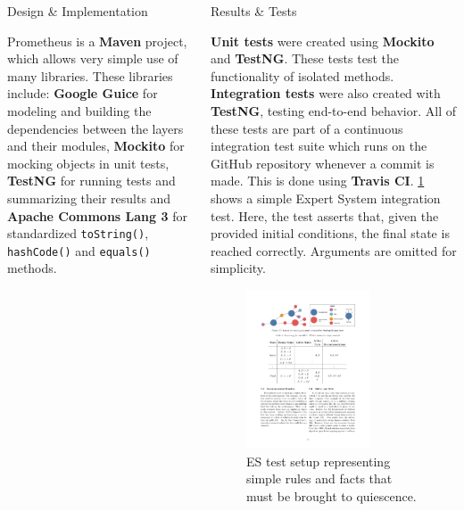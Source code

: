 \documentclass[final]{beamer} %
\newlength{\columnheight}
\newcommand{\code}[1]{\texttt{#1}}
\begin{document}
\begin{frame}
\begin{columns}
\begin{column}{.33\textwidth}
{\begin{block}{Design \& Implementation}
				
				\parbox{0.99\textwidth}{
					Prometheus is a \textbf{Maven} project, which allows very simple use of many libraries. These libraries include: \textbf{Google Guice} for modeling and building the dependencies between the layers and their modules, \textbf{Mockito} for mocking objects in unit tests, \textbf{TestNG} for running tests and summarizing their results and \textbf{Apache Commons Lang 3} for standardized \code{toString()}, \code{hashCode()} and \code{equals()} methods.}
					
				\end{block}
				}
			\end{column}
			\begin{column}{.33\textwidth}
				\parbox[t][\columnheight]{\textwidth}{
				\begin{block}{Results \& Tests}
					\parbox{0.99\textwidth}{
						\textbf{Unit tests} were created using \textbf{Mockito} and \textbf{TestNG}. These tests test the functionality of isolated methods. \textbf{Integration tests} were also created with \textbf{TestNG}, testing end-to-end behavior. All of these tests are part of a continuous integration test suite which runs on the GitHub repository whenever a commit is made. This is done using \textbf{Travis CI}. \cref{fig:test_es} shows a simple Expert System integration test. Here, the test asserts that, given the provided initial conditions, the final state is reached correctly. Arguments are omitted for simplicity.}
					
					\begin{figure}[!htb]
						\centering
						\includegraphics[width=0.702\textwidth]{figures/testES.pdf}
						\caption
						{ES test setup representing simple rules and facts that must be brought to quiescence.}
						\label{fig:test_es}
					\end{figure}
					

\end{block}}
\end{column}
\end{columns}
\end{frame}
\end{document}
